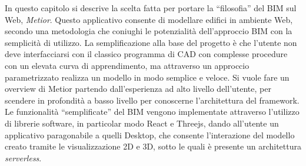 In questo capitolo si descrive la scelta fatta per portare la ``filosofia'' del BIM sul Web, \emph{Metior}.
Questo applicativo consente di modellare edifici in ambiente Web, secondo una metodologia che coniughi le potenzialità
dell’approccio BIM con la semplicità di utilizzo.
La semplificazione alla base del progetto è che l'utente non deve interfacciarsi con il classico programma
di CAD con complesse procedure con un elevata curva di apprendimento, ma attraverso un approccio parametrizzato
realizza un modello in modo semplice e veloce.
Si vuole fare un overview di Metior partendo dall'esperienza ad alto livello dell'utente, per scendere in profondità
a basso livello per conoscerne l'architettura del framework.
Le funzionalità ``semplificate'' del BIM vengono implementate attraverso l'utilizzo di librerie software,
in particolar modo React e Threejs, dando all'utente un applicativo paragonabile a quelli
Desktop, che consente l'interazione del modello creato tramite le visualizzazione 2D e 3D, sotto le quali
è presente un architettura \emph{serverless}.
